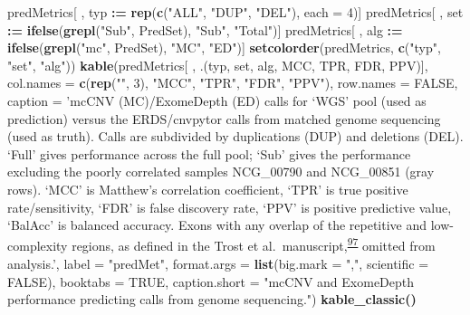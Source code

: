 \documentclass[11pt,letterpaper]{book}
\newenvironment{Shaded}{\begin{snugshade}}{\end{snugshade}}
\newcommand{\DataTypeTok}[1]{\textcolor[rgb]{0.13,0.29,0.53}{#1}}
\newcommand{\DecValTok}[1]{\textcolor[rgb]{0.00,0.00,0.81}{#1}}
\newcommand{\ErrorTok}[1]{\textcolor[rgb]{0.64,0.00,0.00}{\textbf{#1}}}
\newcommand{\KeywordTok}[1]{\textcolor[rgb]{0.13,0.29,0.53}{\textbf{#1}}}
\newcommand{\NormalTok}[1]{#1}
\newcommand{\OperatorTok}[1]{\textcolor[rgb]{0.81,0.36,0.00}{\textbf{#1}}}
\newcommand{\OtherTok}[1]{\textcolor[rgb]{0.56,0.35,0.01}{#1}}
\newcommand{\StringTok}[1]{\textcolor[rgb]{0.31,0.60,0.02}{#1}}
\begin{document}
\begin{Shaded}
\begin{Highlighting}[]
{{{{{{{{{{{{{\NormalTok{predMetrics[ , typ }\OperatorTok{:}\ErrorTok{=}\StringTok{ }\KeywordTok{rep}\NormalTok{(}\KeywordTok{c}\NormalTok{(}\StringTok{"ALL"}\NormalTok{, }\StringTok{"DUP"}\NormalTok{, }\StringTok{"DEL"}\NormalTok{), }\DataTypeTok{each =} \DecValTok{4}\NormalTok{)]}
\NormalTok{predMetrics[ , set }\OperatorTok{:}\ErrorTok{=}\StringTok{ }\KeywordTok{ifelse}\NormalTok{(}\KeywordTok{grepl}\NormalTok{(}\StringTok{"Sub"}\NormalTok{, PredSet), }\StringTok{"Sub"}\NormalTok{, }\StringTok{"Total"}\NormalTok{)]}
\NormalTok{predMetrics[ , alg }\OperatorTok{:}\ErrorTok{=}\StringTok{ }\KeywordTok{ifelse}\NormalTok{(}\KeywordTok{grepl}\NormalTok{(}\StringTok{"mc"}\NormalTok{, PredSet), }\StringTok{"MC"}\NormalTok{, }\StringTok{"ED"}\NormalTok{)]}
\KeywordTok{setcolorder}\NormalTok{(predMetrics, }\KeywordTok{c}\NormalTok{(}\StringTok{"typ"}\NormalTok{, }\StringTok{"set"}\NormalTok{, }\StringTok{"alg"}\NormalTok{))}
\KeywordTok{kable}\NormalTok{(predMetrics[ , .(typ, set, alg, MCC, TPR, FDR, PPV)],}
      \DataTypeTok{col.names =} \KeywordTok{c}\NormalTok{(}\KeywordTok{rep}\NormalTok{(}\StringTok{""}\NormalTok{, }\DecValTok{3}\NormalTok{), }\StringTok{"MCC"}\NormalTok{, }\StringTok{"TPR"}\NormalTok{, }\StringTok{"FDR"}\NormalTok{, }\StringTok{"PPV"}\NormalTok{),}
      \DataTypeTok{row.names =} \OtherTok{FALSE}\NormalTok{, }
      \DataTypeTok{caption =} \StringTok{'mcCNV (MC)/ExomeDepth (ED) calls for `WGS' pool (used as prediction) versus the ERDS/cnvpytor calls from matched genome sequencing (used as truth). Calls are subdivided by duplications (DUP) and deletions (DEL). `Full' gives performance across the full pool; `Sub' gives the performance excluding the poorly correlated samples NCG\_00790 and NCG\_00851 (gray rows). `MCC' is Matthew's correlation coefficient, `TPR' is true positive rate/sensitivity, `FDR' is false discovery rate, `PPV' is positive predictive value, `BalAcc' is balanced accuracy. Exons with any overlap of the repetitive and low-complexity regions, as defined in the Trost et al.~manuscript,\textsuperscript{\protect\hyperlink{ref-trost:2018aa}{97}} omitted from analysis.'}\NormalTok{,}
      \DataTypeTok{label =} \StringTok{"predMet"}\NormalTok{,}
      \DataTypeTok{format.args =} \KeywordTok{list}\NormalTok{(}\DataTypeTok{big.mark =} \StringTok{","}\NormalTok{, }\DataTypeTok{scientific =} \OtherTok{FALSE}\NormalTok{),}
      \DataTypeTok{booktabs =} \OtherTok{TRUE}\NormalTok{,}
      \DataTypeTok{caption.short =} \StringTok{"mcCNV and ExomeDepth performance predicting calls from genome sequencing."}\NormalTok{) }\OperatorTok{%>%}
\StringTok{  }\KeywordTok{kable_classic}\NormalTok{() }\OperatorTok{%>%}
}}}}}}}}}}}}}}}
\end{Highlighting}
\end{Shaded}
\end{document}
